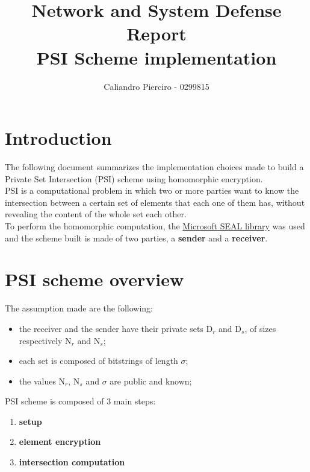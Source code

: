 \documentclass[10pt]{extarticle}
\title{Network and System Defense Report\\PSI Scheme implementation}
\author{Caliandro Pierciro - 0299815}
\begin{document}
\maketitle
\tableofcontents
\newpage

\section{Introduction}
The following document summarizes the implementation choices made to build a Private Set Intersection (PSI) scheme using homomorphic encryption.\\
PSI is a computational problem in which two or more parties want to know the intersection between a certain set of elements that each one of them has, without revealing the content of the whole set each other.\\
To perform the homomorphic computation, the \href{https://github.com/Microsoft/SEAL}{Microsoft SEAL library} was used and the scheme built is made of two parties, a \textbf{sender} and a \textbf{receiver}.
\section{PSI scheme overview}
The assumption made are the following:
\begin{itemize}
	\item the receiver and the sender have their private sets D$_r$ and D$_s$, of sizes respectively N$_r$ and N$_s$;
	\item each set is composed of bitstrings of length $\sigma$;
	\item the values N$_r$, N$_s$ and $\sigma$ are public and known;
\end{itemize}
PSI scheme is composed of 3 main steps:
\begin{enumerate}
	\item \textbf{setup}
	\item \textbf{element encryption}
	\item \textbf{intersection computation}
\end{enumerate}
\end{document}
